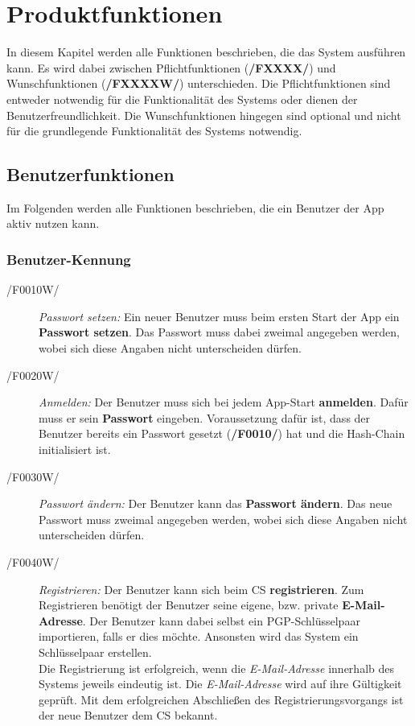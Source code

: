 \section{Produktfunktionen}
In diesem Kapitel werden alle Funktionen beschrieben, die das System ausführen kann. 
Es wird dabei zwischen Pflichtfunktionen (\textbf{/FXXXX/}) und Wunschfunktionen (\textbf{/FXXXXW/}) unterschieden. 
Die Pflichtfunktionen sind entweder notwendig für die Funktionalität des Systems oder dienen der Benutzerfreundlichkeit.
Die Wunschfunktionen hingegen sind optional und nicht für die grundlegende Funktionalität des Systems notwendig.

\subsection{Benutzerfunktionen}
Im Folgenden werden alle Funktionen beschrieben, die ein Benutzer der App aktiv nutzen kann.
\subsubsection{Benutzer-Kennung}
	\begin{description}
		\item[/F0010W/]
			\textit{Passwort setzen:}
			Ein neuer Benutzer muss beim ersten Start der App ein \textbf{Passwort setzen}. 
			Das Passwort muss dabei zweimal angegeben werden, wobei sich diese Angaben nicht unterscheiden dürfen.
		\item[/F0020W/]
			\textit{Anmelden:}
			Der Benutzer muss sich bei jedem App-Start \textbf{anmelden}. 
			Dafür muss er sein \textbf{Passwort} eingeben.
			Voraussetzung dafür ist, dass der Benutzer bereits ein Passwort gesetzt (\textbf{/F0010/}) hat und die Hash-Chain initialisiert ist.
		\item[/F0030W/]
			\textit{Passwort ändern:}
				Der Benutzer kann das \textbf{Passwort ändern}.
				Das neue Passwort muss zweimal angegeben werden, wobei sich diese Angaben nicht unterscheiden dürfen.
		\item[/F0040W/]
			\textit{Registrieren:}
			Der Benutzer kann sich beim \ac{CS} \textbf{registrieren}.
			Zum Registrieren benötigt der Benutzer seine eigene, bzw. private \textbf{E-Mail-Adresse}.
			Der Benutzer kann dabei selbst ein PGP-Schlüsselpaar importieren, falls er dies möchte. 
			Ansonsten wird das System ein Schlüsselpaar erstellen.\\
			Die Registrierung ist erfolgreich, wenn die \textit{E-Mail-Adresse} innerhalb des Systems jeweils eindeutig ist. 
			Die \textit{E-Mail-Adresse} wird auf ihre Gültigkeit geprüft. 
			Mit dem erfolgreichen Abschließen des Registrierungsvorgangs ist der neue Benutzer  dem \ac{CS} bekannt.
	\end{description}
